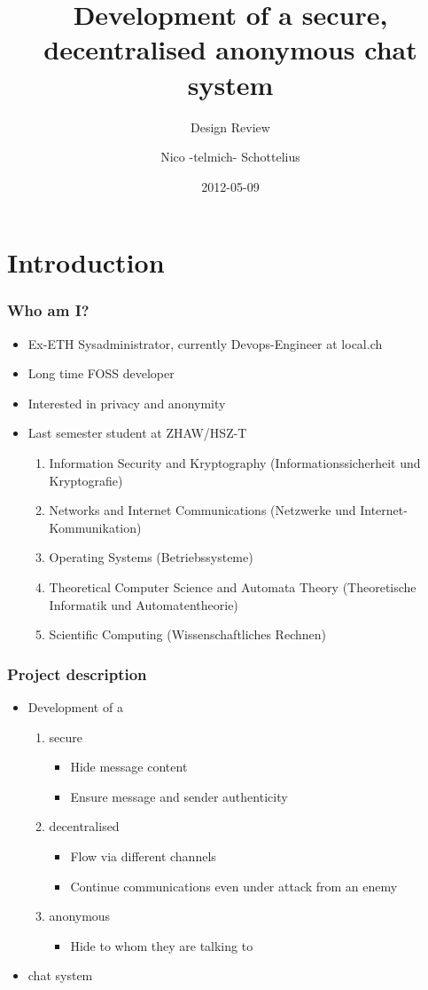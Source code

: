 \documentclass{beamer}
\title{Development of a secure, decentralised anonymous chat system}
\subtitle{Design Review}
\author{Nico -telmich- Schottelius}
\date{2012-05-09}
\begin{document}
\frame{\titlepage}

\frame{\tableofcontents}

\section{Introduction}
\frame
{
  \frametitle{Who am I?}
  \begin{itemize}
  \item Ex-ETH Sysadministrator, currently Devops-Engineer at local.ch
  \item Long time FOSS developer 
  \item Interested in privacy and anonymity
  \item Last semester student at ZHAW/HSZ-T
  \begin{enumerate}
      \item  Information Security and Kryptography (Informationssicherheit und Kryptografie)
      \item  Networks and Internet Communications (Netzwerke und Internet-Kommunikation)
      \item  Operating Systems (Betriebssysteme)
      \item  Theoretical Computer Science and Automata Theory (Theoretische Informatik und Automatentheorie)
      \item  Scientific Computing (Wissenschaftliches Rechnen)
  \end{enumerate}
  \end{itemize}
}

\frame
{
  \frametitle{Project description}
  \begin{itemize}
  \item Development of a
  \begin{enumerate}
      \item  secure
          \begin{itemize}
          \item Hide message content
          \item Ensure message and sender authenticity
          \end{itemize}
      \item  decentralised
          \begin{itemize}
          \item Flow via different channels
          \item Continue communications even under attack from an enemy
          \end{itemize}
      \item  anonymous
          \begin{itemize}
          \item Hide to whom they are talking to
          \end{itemize}
  \end{enumerate}
  \item chat system
  \end{itemize}
}
\end{document}

